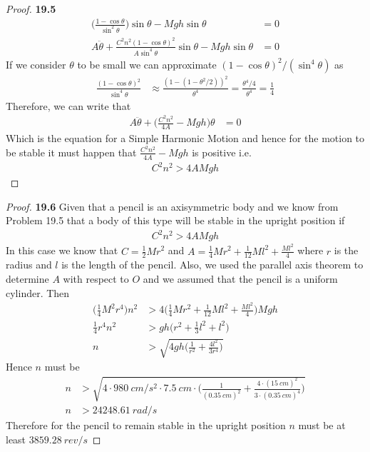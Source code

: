 \documentclass[11pt]{article}
\theoremstyle{definition}
\begin{document}
\begin{proof}{\textbf{19.5}}
\begin{align*}
        \bigg(\frac{1 - \cos\theta}{\sin^2\theta}\bigg)\sin\theta
        - Mgh\sin\theta
        &= 0\\
        A\ddot\theta + \frac{C^2n^2(1 - \cos\theta)^2}{A \sin^4\theta}
        \sin\theta - Mgh\sin\theta
        &= 0
    \end{align*}
    If we consider $\theta$ to be small we can approximate 
    $(1 - \cos\theta)^2/(\sin^4\theta)$ as 
    \begin{align*}
        \frac{(1 - \cos\theta)^2}{\sin^4\theta}
        &\approx \frac{(1 - (1 -\theta^2/2))^2}{\theta^4}
        = \frac{\theta^4/4}{\theta^4}
        = \frac{1}{4}
    \end{align*}
    Therefore, we can write that
    \begin{align*}
        A\ddot\theta + \bigg(\frac{C^2n^2}{4A} - Mgh\bigg)\theta &= 0
    \end{align*}
    Which is the equation for a Simple Harmonic Motion and hence for the motion
    to be stable it must happen that $\frac{C^2n^2}{4A} - Mgh$ is positive
    i.e.
    \begin{align*}
        C^2n^2 > 4AMgh
    \end{align*}
\end{proof}
\cleardoublepage
\begin{proof}{\textbf{19.6}}
    Given that a pencil is an axisymmetric body and we know from Problem 19.5
    that a body of this type will be stable in the upright position if
    \begin{align*}
        C^2n^2 > 4AMgh
    \end{align*}
    In this case we know that $C = \frac{1}{2}Mr^2$ and
    $A = \frac{1}{4}M r^2 + \frac{1}{12}M l^2 + \frac{Ml^2}{4}$ where $r$
    is the radius and $l$ is the length of the pencil.
    Also, we used the parallel axis theorem to determine $A$ with respect to
    $O$ and we assumed that the pencil is a uniform cylinder. Then
    \begin{align*}
        \bigg(\frac{1}{4}M^2r^4\bigg)n^2
        &> 4\bigg(\frac{1}{4}M r^2 + \frac{1}{12}M l^2 + \frac{Ml^2}{4}\bigg)Mgh\\
        \frac{1}{4}r^4n^2 &> gh\bigg(r^2 + \frac{1}{3}l^2 + l^2\bigg)\\
        n &> \sqrt{4gh\bigg(\frac{1}{r^2} + \frac{4l^2}{3r^4}\bigg)}
    \end{align*}
    Hence $n$ must be
    \begin{align*}
        n &> \sqrt{4\cdot 980~cm/s^2 \cdot 7.5~cm \cdot
        \bigg(\frac{1}{(0.35~cm)^2}
        + \frac{4 \cdot(15~cm)^2}{3\cdot(0.35~cm)^4}\bigg)}\\
        n &> 24248.61~rad/s
    \end{align*}
    Therefore for the pencil to remain stable in the upright position $n$ must
    be at least $3859.28~rev/s$

\end{proof}
\end{document}
